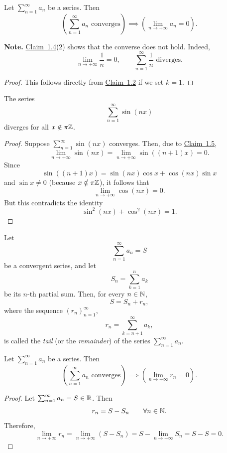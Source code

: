 \begin{claim}\label{claim:1.5}
Let $\sum_{n=1}^{\infty}a_n$ be a series. Then
\[
\left(\sum_{n=1}^{\infty}a_n\text{ converges}\right)
\implies
\left(\lim_{n\to+\infty}a_n=0\right).
\]
\end{claim}

\noindent\textbf{Note.} \hyperref[claim:1.4]{Claim~1.4}(2) shows that the converse does not hold. Indeed,
\[
\lim_{n\to+\infty}\frac1n=0,
\qquad
\sum_{n=1}^{\infty}\frac1n\text{ diverges}.
\]

\begin{proof}
This follows directly from \hyperref[claim:1.2]{Claim~1.2} if we set $k=1$.
\end{proof}

\begin{claim}\label{claim:1.6}
The series
\[
\sum_{n=1}^{\infty}\sin(nx)
\]
diverges for all $x\notin\pi\mathbb{Z}$.
\end{claim}

\begin{proof}
Suppose $\sum_{n=1}^{\infty}\sin(nx)$ converges. Then, due to \hyperref[claim:1.5]{Claim~1.5},
\[
\lim_{n\to+\infty}\sin(nx)
=\lim_{n\to+\infty}\sin((n+1)x)=0.
\]
Since
\[
\sin((n+1)x)=\sin(nx)\cos x+\cos(nx)\sin x
\]
and $\sin x\ne0$ (because $x\notin\pi\mathbb{Z}$), it follows that
\[
\lim_{n\to+\infty}\cos(nx)=0.
\]
But this contradicts the identity
\[
\sin^2(nx)+\cos^2(nx)=1.
\]
\end{proof}

\begin{definition}\label{def:1.5}
Let
\[
\sum_{n=1}^{\infty}a_n=S
\]
be a convergent series, and let
\[
S_n=\sum_{k=1}^{n}a_k
\]
be its $n$-th partial sum. Then, for every $n\in\mathbb{N}$,
\[
S=S_n+r_n,
\]
where the sequence $(r_n)_{n=1}^{\infty}$,
\[
r_n=\sum_{k=n+1}^{\infty}a_k,
\]
is called the \emph{tail} (or the \emph{remainder}) of the series $\sum_{n=1}^{\infty}a_n$.
\end{definition}

\begin{claim}\label{claim:1.7}
Let $\sum_{n=1}^{\infty}a_n$ be a series. Then
\[
\left(\sum_{n=1}^{\infty}a_n\text{ converges}\right)
\implies
\left(\lim_{n\to+\infty}r_n=0\right).
\]
\end{claim}

\begin{proof}
Let $\sum_{n=1}^{\infty}a_n=S\in\mathbb{R}$. Then
\[
r_n=S-S_n\qquad\forall n\in\mathbb{N}.
\]
Therefore,
\[
\lim_{n\to+\infty}r_n
=\lim_{n\to+\infty}(S-S_n)
=S-\lim_{n\to+\infty}S_n
=S-S=0.
\]
\end{proof}

